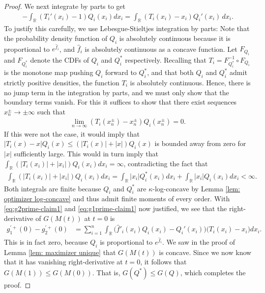 \documentclass[11pt,reqno]{amsart}
\numberwithin{equation}{section}
\theoremstyle{definition}
\def\R{{\mathbb R}}
\begin{document}
\begin{proof}
	We next integrate by parts to get
	\begin{align}
		-\int_{\R}  \left(T_i'(x_i) - 1\right)Q_i(x_i) dx_i =  \int_\R \left(T_i(x_i) - x_i\right)Q_i'(x_i) \, dx_i. \label{eq:g2prime-claim1}
	\end{align}
	To justify this carefully, we use Lebesgue-Stieltjes integration by parts: Note that the probability density function of $Q_i$ is absolutely continuous because it is proportional to $e^{\hat{f}_i}$, and $\hat{f}_i$ is absolutely continuous as a concave function. Let $ F_{Q_i} $ and $ F_{Q^*_i} $ denote the CDFs of $ Q_i $ and $ Q^*_i $ respectively. Recalling that $T_i=F_{Q^*_i}^{-1} \circ F_{Q_i}$ is the monotone map pushing $Q_i$ forward to $Q^*_i$, and that both $Q_i$ and $Q^*_i$ admit strictly positive densities, the function $T_i$ is absolutely continuous. Hence, there is no jump term in the integration by parts, and we must only show that the boundary terms vanish. For this it suffices to show that there exist sequences $x^{\pm}_n \to \pm\infty$ such that
	\begin{align*}
		\lim_{n \to \infty} (T_i(x^\pm_n)-x^\pm_n)Q_i(x^\pm_n) = 0.
	\end{align*}
	If this were not the case, it would imply that $|T_i(x)-x|Q_i(x) \le (|T_i(x)|+|x|)Q_i(x)$ is bounded away from zero for $|x|$ sufficiently large. This would in turn imply that $\int_\R (|T_i(x_i)|+|x_i|)Q_i(x_i) dx_i= \infty$, contradicting
the fact that
\begin{align*}
\int_\R (|T_i(x_i)|+|x_i|)Q_i(x_i)dx_i = \int_\R |x_i|Q^*_i(x_i)dx_i + \int_\R |x_i|Q_i(x_i)dx_i < \infty.
\end{align*}
Both integrals are finite because $ Q_i $ and $Q^*_i$ are $ \kappa $-log-concave by Lemma \ref{lem: optimizer log-concave} and thus admit finite moments of every order. 
	With \eqref{eq:g2prime-claim1} and \eqref{eq:g1prime-claim1} now justified, we see that the right-derivative of $G(M(t))$ at $t=0$ is
	\begin{align*}
		g_1^{\prime +}(0) - g_2^{\prime +}(0) &= \sum_{i=1}^n\int_\R  \big(\hat{f}'_i (x_i)Q_i(x_i) - Q_i'(x_i)\big) \big( T_i (x_i) - x_i \big) dx_i.
	\end{align*}
	This is in fact zero, because $Q_i$ is proportional to $e^{\hat{f}_i}$. We saw in the proof of Lemma \ref{lem: maximizer unique} that $G(M(t))$ is concave. Since we now know that it has vanishing right-derivative at $t=0$, it follows that $G(M(1)) \le G(M(0))$. That is, $G(Q^*) \le G(Q)$, which completes the proof.
\end{proof}
\end{document}
